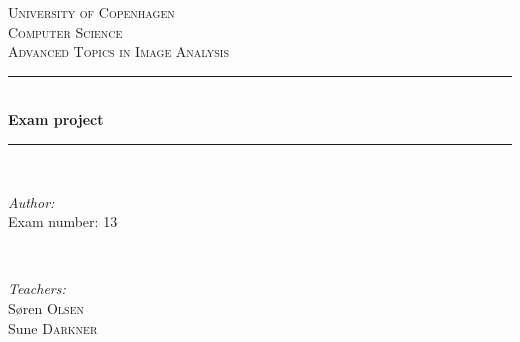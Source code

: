 \documentclass{article}                                                        %
\begin{document}
\begin{titlepage}

\newcommand{\HRule}{\rule{\linewidth}{0.5mm}} %

\begin{center}
 

\textsc{\LARGE University of Copenhagen}\\[1.5cm] %
\textsc{\Large Computer Science}\\[0.5cm] %
\textsc{\large Advanced Topics in Image Analysis}\\[0.5cm] %


\HRule \\[0.4cm]
{ \huge \bfseries Exam project}\\[0.4cm] %
\HRule \\[1.5cm]
 

\begin{minipage}{0.4\textwidth}
\begin{flushleft} \large
\emph{Author:}\\ 
Exam number: 13 \\
\hfill
\end{flushleft}
\end{minipage}
~
\begin{minipage}{0.4\textwidth}
\begin{flushright} \large
\emph{Teachers:} \\
Søren \textsc{Olsen}\\
Sune  \textsc{Darkner}
\end{flushright}
\end{minipage}\\[2cm]


\end{center}
\end{titlepage}
\end{document}
